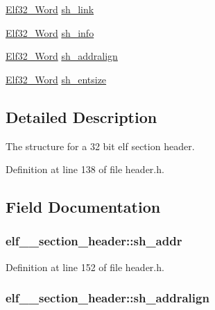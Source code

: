 \begin{DoxyCompactItemize}
\item 
\hyperlink{header_8h_aaf2adb6079d594afee7de40cee594c34}{Elf32\_\-Word} \hyperlink{structelf__32__section__header_a969ab9a409cd63670a32c66e8ce2df73}{sh\_\-link}
\item 
\hyperlink{header_8h_aaf2adb6079d594afee7de40cee594c34}{Elf32\_\-Word} \hyperlink{structelf__32__section__header_a8ae1c8f02eff2a0cd819d7e5db333ec9}{sh\_\-info}
\item 
\hyperlink{header_8h_aaf2adb6079d594afee7de40cee594c34}{Elf32\_\-Word} \hyperlink{structelf__32__section__header_a6f0e976649e646aa6b9ebbf041602685}{sh\_\-addralign}
\item 
\hyperlink{header_8h_aaf2adb6079d594afee7de40cee594c34}{Elf32\_\-Word} \hyperlink{structelf__32__section__header_abea1c9ab55479738b3d4293d5c983a01}{sh\_\-entsize}
\end{DoxyCompactItemize}


\subsection{Detailed Description}
The structure for a 32 bit elf section header. 

Definition at line 138 of file header.h.



\subsection{Field Documentation}
\hypertarget{structelf__32__section__header_a39df760c684f21d4e3112988f5576b9f}{
\subsubsection[{sh\_\-addr}]{ {\bf elf\_\_\-section\_\-header::sh\_\-addr}}}
\label{structelf__32__section__header_a39df760c684f21d4e3112988f5576b9f}


Definition at line 152 of file header.h.

\hypertarget{structelf__32__section__header_a6f0e976649e646aa6b9ebbf041602685}{
\subsubsection[{sh\_\-addralign}]{ {\bf elf\_\_\-section\_\-header::sh\_\-addralign}}}
\label{structelf__32__section__header_a6f0e976649e646aa6b9ebbf041602685}



